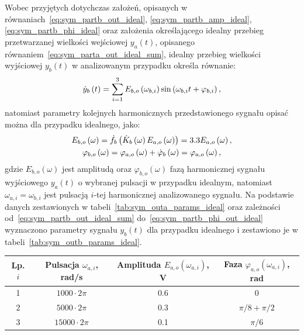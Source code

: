 Wobec przyjętych dotychczas założeń, opisanych w równaniach~\eqref{eq:sym_partb_out_ideal}, \eqref{eq:sym_partb_amp_ideal}, \eqref{eq:sym_partb_phi_ideal} oraz założenia określającego idealny przebieg przetwarzanej wielkości wejściowej $y_{a}(t)$, opisanego równaniem~\eqref{eq:sym_parta_out_ideal_sum}, idealny przebieg wielkości wyjściowej $y_{b}(t)$ w analizowanym przypadku określa równanie:
\begin{equation}
\dot{y}_{b} \left(t\right) = \sum _{i=1} ^{3} E_{b,o} \left(\omega_{b,i}\right) \sin \left(\omega_{b,i} t + \varphi_{b,i}\right) \label{eq:sym_partb_out_ideal_sum},
\end{equation}
natomiast parametry kolejnych harmonicznych przedstawionego sygnału opisać można dla przypadku idealnego, jako:
\begin{gather}
E_{b,o} \left(\omega\right) = \dot{f}_{b} \left(\dot{K}_{b} \left(\omega\right) E_{a,o} \left(\omega\right)\right) = 3.3 E_{a,o} \left(\omega\right) \label{eq:sym_partb_amp_out_ideal}, \\
\varphi_{b,o} \left(\omega\right) = \varphi_{a,o} \left(\omega\right) + \dot{\varphi}_{b} \left(\omega\right) = \varphi_{a,o} \left(\omega\right) \label{eq:sym_partb_phi_out_ideal},
\end{gather}
gdzie $E_{b,o}(\omega)$ jest amplitudą oraz $\varphi_{b,o}(\omega)$ fazą harmonicznej sygnału wyjściowego $y_{a}(t)$ o wybranej pulsacji w przypadku idealnym, natomiast $\omega_{a,i} = \omega_{b,i}$ jest pulsacją $i$-tej harmonicznej analizowanego sygnału. Na podstawie danych zestawionych w tabeli~\ref{tab:sym_outa_params_ideal} oraz zależności od~\eqref{eq:sym_partb_out_ideal_sum} do~\eqref{eq:sym_partb_phi_out_ideal} wyznaczono parametry sygnału $y_{b}(t)$ dla przypadku idealnego i zestawiono je w tabeli~\ref{tab:sym_outb_params_ideal}.

\begin{table}[htb!]
\begin{center}
\begin{tabular}[c]{| c | c | c | c |} \hline
\textbf{Lp. $i$} & \textbf{Pulsacja $\omega_{a,i}$, rad/s} & \textbf{Amplituda $E_{a,o}(\omega_{a,i})$, V} & \textbf{Faza $\varphi_{a,o}(\omega_{a,i})$, rad} \\ \hline
1 & $1000  \cdot 2\pi$ &  0.6 & $0$                 \\ \hline
2 & $5000  \cdot 2\pi$ &  0.3 & $\pi / 8 + \pi / 2$ \\ \hline
3 & $15000 \cdot 2\pi$ &  0.1 & $\pi / 6$           \\ \hline
\end{tabular}
\end{center}
\end{table}

